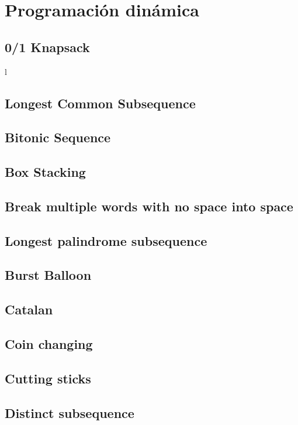 \documentclass[oneside]{book}
\begin{document}
	\chapter{Programaci\'on din\'amica}
	\section{0/1 Knapsack}
	l
	\section{Longest Common Subsequence}
	
	\section{Bitonic Sequence}
	
	\section{Box Stacking}
	
	\section{Break multiple words with no space into space}
	
	\section{Longest palindrome subsequence}
	
	\section{Burst Balloon}
	
	\section{Catalan}
	
	\section{Coin changing}
	
	\section{Cutting sticks}
	
	\section{Distinct subsequence}
	
\end{document}
